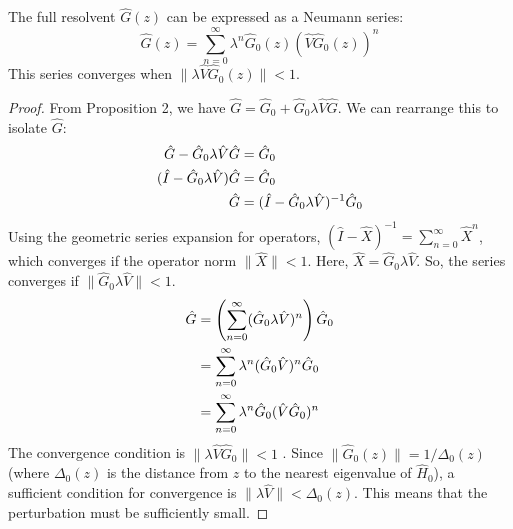 \begin{theorem}
  The full resolvent $\hat G(z)$ can be expressed as a Neumann series:
  \begin{equation} \label{eq:neumann_series_resolvent}
    \hat G(z) = \sum_{n=0}^\infty \lambda^n \hat G_0(z) (\hat V
    \hat G_0(z))^n
  \end{equation}
  This series converges when $\|\lambda \hat V \hat G_0(z)\| < 1$.
\end{theorem}
\begin{proof}
  From Proposition 2, we have $\hat G = \hat G_0 + \hat G_0
  \lambda \hat V \hat G$. We can rearrange this to isolate $\hat G$:
  \begin{align}
    \hat G - \hat G_0 \lambda \hat V \hat G &= \hat G_0 \\
    (\hat I - \hat G_0 \lambda \hat V) \hat G &= \hat G_0 \notag \\
    \hat G &= (\hat I - \hat G_0 \lambda \hat V)^{-1} \hat G_0 \notag
  \end{align}
  Using the geometric series expansion for operators, $(\hat I -
  \hat X)^{-1} = \sum_{n=0}^\infty \hat X^n$, which converges if
  the operator norm $\|\hat X\| < 1$. Here, $\hat X = \hat G_0
  \lambda \hat V$. So, the series converges if $\|\hat G_0 \lambda
  \hat V\| < 1$.
  \begin{align} \label{eq:neumann_series_derivation}
    \hat G &= \left( \sum_{n=0}^\infty (\hat G_0 \lambda \hat
    V)^n \right) \hat G_0 \\
    &= \sum_{n=0}^\infty \lambda^n (\hat G_0 \hat V)^n \hat G_0 \notag \\
    &= \sum_{n=0}^\infty \lambda^n \hat G_0 (\hat V \hat G_0)^n \notag
  \end{align}
  The convergence condition is $\|\lambda \hat V \hat G_0\| < 1$
  . Since $\|\hat G_0(z)\|=1/\Delta_0(z)$ (where
    $\Delta_0(z)$ is the distance from $z$ to the nearest eigenvalue
  of $\hat H_0$), a sufficient condition for convergence is
  $\|\lambda \hat V\| < \Delta_0(z)$. This means that the
  perturbation must be sufficiently small.
\end{proof}

